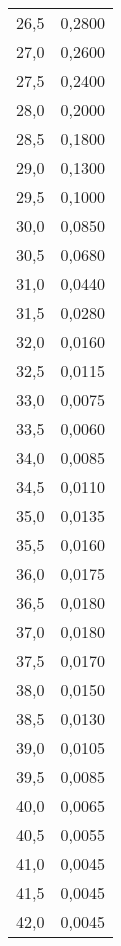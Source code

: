 \begin{table}[H]
\begin{tabular}[t]{c c}
    \midrule
    26,5 & 0,2800 \\
    27,0 & 0,2600 \\
    27,5 & 0,2400 \\
    28,0 & 0,2000 \\
    28,5 & 0,1800 \\
    29,0 & 0,1300 \\
    29,5 & 0,1000 \\
    30,0 & 0,0850 \\
    30,5 & 0,0680 \\
    31,0 & 0,0440 \\
    31,5 & 0,0280 \\
    32,0 & 0,0160 \\
    32,5 & 0,0115 \\
    33,0 & 0,0075 \\
    33,5 & 0,0060 \\
    34,0 & 0,0085 \\
    34,5 & 0,0110 \\
    35,0 & 0,0135 \\
    35,5 & 0,0160 \\
    36,0 & 0,0175 \\
    36,5 & 0,0180 \\
    37,0 & 0,0180 \\
    37,5 & 0,0170 \\
    38,0 & 0,0150 \\
    38,5 & 0,0130 \\
    39,0 & 0,0105 \\
    39,5 & 0,0085 \\
    40,0 & 0,0065 \\
    40,5 & 0,0055 \\
    41,0 & 0,0045 \\
    41,5 & 0,0045 \\
    42,0 & 0,0045 \\
    \bottomrule
  \end{tabular}
\end{table}
